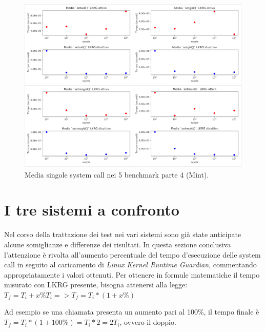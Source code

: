 \begin{figure}[!htbp]
\centering
\includegraphics[scale=1.35]{Figures/Debian/Mean4}
\caption[Media singole system call nei 5 benchmark parte 4 (Mint)]{Media singole system call nei 5 benchmark parte 4 (Mint).}
\label{fig:mean4MintFig}
\end{figure}

\section{I tre sistemi a confronto}

Nel corso della trattazione dei test nei vari sistemi sono già state anticipate alcune somiglianze e differenze dei risultati. In questa sezione conclusiva l'attenzione è rivolta all'aumento percentuale del tempo d'esecuzione delle system call in seguito al caricamento di \emph{Linux Kernel Runtime Guardian}, commentando appropriatamente i valori ottenuti. Per ottenere in formule matematiche il tempo misurato con LKRG presente, bisogna attenersi alla legge:\\
$T_f = T_i + x\%T_i => T_f = T_i * (1 + x\%)$

Ad esempio se una chiamata presenta un aumento pari al 100\%, il tempo finale è $T_f = T_i * (1 + 100\%) = T_i * 2 = 2T_i$, ovvero il doppio.

